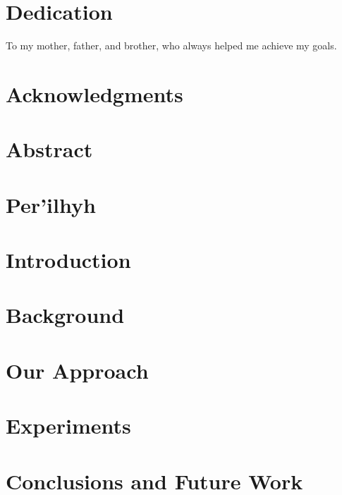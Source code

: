 \documentclass[twoside,11pt]{report}
\begin{document}
	\chapter*{Dedication}
	\setcounter{page}{1}
	To my mother, father, and brother, who always helped me achieve my goals.
	
	\chapter*{Acknowledgments}
	 
	
	\chapter*{Abstract}
	
	
	\chapter*{\foreignlanguage{greek}{Per'ilhyh}}
	
	
	\listoffigures
	\listofalgorithms
	\tableofcontents
	
	\chapter{Introduction}
	\label{sec:Introduction}
	
	
	\chapter{Background}
	\label{sec:Background}
	
	
	\chapter{Our Approach}
	\label{sec:Approach}
	
	
	\chapter{Experiments}
	\label{sec:Experiments}
	
	
	\chapter{Conclusions and Future Work}
	\label{sec:Conclusions}
	
	
	\setlength{}
	\printbibliography

	

	
\end{document}
